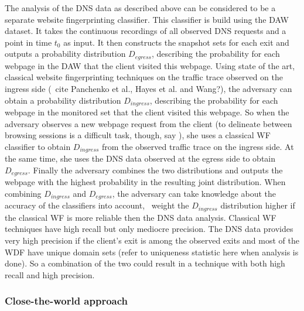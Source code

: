 The analysis of the DNS data as described above can be considered to be
a separate website fingerprinting classifier. This classifier is build
using the DAW dataset. It takes the continuous recordings of all
observed DNS requests and a point in time $t_0$ as input. It then
constructs the snapshot sets for each exit and outputs a probability
distribution $D_{egress}$, describing the probability for each webpage
in the DAW that the client visited this webpage.
%
Using state of the art, classical website fingerprinting techniques on
the traffic trace observed on the ingress side (\eg~cite Panchenko et
al., Hayes et al. and Wang?), the adversary can obtain a probability
distribution $D_{ingress}$, describing the probability for each webpage
in the monitored set that the client visited this webpage.
%
So when the adversary observes a new webpage request from the client (to
delineate between browsing sessions is a difficult task, though, say
\cite{Coull2007a}), she uses a classical WF classifier to obtain
$D_{ingress}$ from the observed traffic trace on the ingress side. At
the same time, she uses the DNS data observed at the egress side to
obtain $D_{egress}$. Finally the adversary combines the two
distributions and outputs the webpage with the highest probability in
the resulting joint distribution.
%
When combining $D_{ingress}$ and $D_{egress}$, the adversary can take
knowledge about the accuracy of the classifiers into account, \eg~weight
the $D_{ingress}$ distribution higher if the classical WF is more
reliable then the DNS data analysis.
%
Classical WF techniques have high recall but only mediocre precision.
The DNS data provides very high precision if the client's exit is among
the observed exits and most of the WDF have unique domain sets (refer to
uniqueness statistic here when analysis is done). So a combination of
the two could result in a technique with both high recall and high
precision.


\subsubsection{Close-the-world approach}

